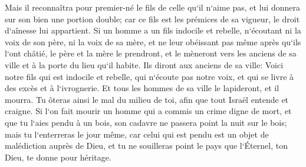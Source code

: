 \verse Mais il reconnaîtra pour premier-né le fils de celle qu`il n`aime pas, et lui donnera sur son bien une portion double; car ce fils est les prémices de sa vigueur, le droit d`aînesse lui appartient. 
\verse Si un homme a un fils indocile et rebelle, n`écoutant ni la voix de son père, ni la voix de sa mère, et ne leur obéissant pas même après qu`ils l`ont châtié, 
\verse le père et la mère le prendront, et le mèneront vers les anciens de sa ville et à la porte du lieu qu`il habite. 
\verse Ils diront aux anciens de sa ville: Voici notre fils qui est indocile et rebelle, qui n`écoute pas notre voix, et qui se livre à des excès et à l`ivrognerie. 
\verse Et tous les hommes de sa ville le lapideront, et il mourra. Tu ôteras ainsi le mal du milieu de toi, afin que tout Israël entende et craigne. 
\verse Si l`on fait mourir un homme qui a commis un crime digne de mort, et que tu l`aies pendu à un bois, 
\verse son cadavre ne passera point la nuit sur le bois; mais tu l`enterreras le jour même, car celui qui est pendu est un objet de malédiction auprès de Dieu, et tu ne souilleras point le pays que l`Éternel, ton Dieu, te donne pour héritage. 

